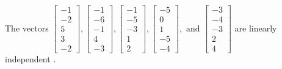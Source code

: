 \begin{exercise}
\begin{exerciseStatement}
  \end{exerciseStatement}
  \begin{exerciseAnswer}
   The vectors \(\left[\begin{array}{r}
-1 \\
-2 \\
5 \\
3 \\
-2
\end{array}\right] , \left[\begin{array}{r}
-1 \\
-6 \\
-1 \\
4 \\
-3
\end{array}\right] , \left[\begin{array}{r}
-1 \\
-5 \\
-3 \\
1 \\
2
\end{array}\right] , \left[\begin{array}{r}
-5 \\
0 \\
1 \\
-5 \\
-4
\end{array}\right] , \text{ and } \left[\begin{array}{r}
-3 \\
-4 \\
-3 \\
2 \\
4
\end{array}\right]\) are 
  	 linearly independent  .
  


  \end{exerciseAnswer}
\end{exercise}